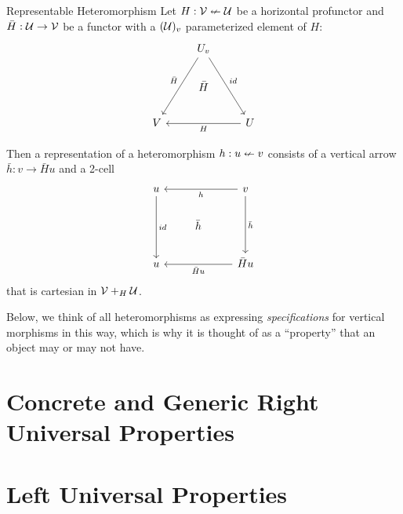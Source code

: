 \documentclass{article}
\begin{document}
\begin{definition}{Representable Heteromorphism}
  Let $H : \mathcal V \nleftarrow \mathcal U$ be a horizontal profunctor and
  $\bar H : \mathcal U \to \mathcal V$ be a functor with a $(\mathcal U)_v$
  parameterized element of $H$:
  \[
  \begin{tikzcd}
 & U_v \arrow[ldd, "\bar H"'] \arrow[rdd, "id"] &  \\
 & \bar H &  \\
V &  & U \arrow[ll, "H"]
\end{tikzcd}
  \]

  Then a representation of a heteromorphism $h : u \nleftarrow v$ consists
  of a vertical arrow $\bar h : v \to \bar H u$ and a 2-cell
  \[
  \begin{tikzcd}
u \arrow[dd, "id"] &  & v \arrow[dd, "\bar h"] \arrow[ll, "h"] \\
 & \bar h &  \\
u &  & \bar H u \arrow[ll, "\bar H u"]
  \end{tikzcd}
  \]
  that is cartesian in $\mathcal V +_{H} \mathcal U$.
\end{definition}

Below, we think of all heteromorphisms as expressing
\emph{specifications} for vertical morphisms in this way, which is why
it is thought of as a ``property'' that an object may or may not have.

\section{Concrete and Generic Right Universal Properties}



\section{Left Universal Properties}
\end{document}
